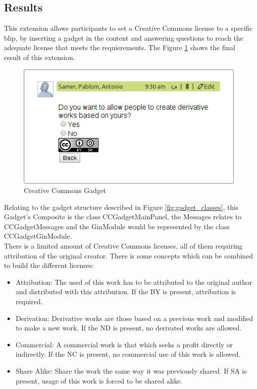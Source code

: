 \subsection{Results}
This extension allows participants to set a Creative Commons license to a specific blip, by inserting a gadget in the content and answering questions to reach the adequate license that meets the requierements. The Figure \ref{fig:cc_gadget} shows the final result of this extension.
\begin{figure}[h]
  \center
    \includegraphics[keepaspectratio, scale=0.7]{Media/Captures/Extensions/CCGadget.png}
  \caption{Creative Commons Gadget}
  \label{fig:cc_gadget}
\end{figure}
Relating to the gadget structure described in Figure \ref{fig:gadget_classes}, this Gadget's Composite is the class CCGadgetMainPanel, the Messages relates to CCGadgetMessages and the GinModule would be represented by the class CCGadgetGinModule.\\[.2cm]
There is a limited amount of Creative Commons licenses, all of them requiring attribution of the original creator. There is some concepts which can be combined to build the different licenses:
\begin{itemize}
  \item Attribution: The used of this work has to be attributed to the original author and distributed with this attribution. If the BY is present, attribution is required.
  \item Derivation: Derivative works are those based on a previous work and modified to make a new work. If the ND is present, no derivated works are allowed.
  \item Commercial: A commercial work is that which seeks a profit directly or indirectly. If the NC is present, no commercial use of this work is allowed.
  \item Share Alike: Share the work the same way it was previously shared. If SA is present, usage of this work is forced to be shared alike.
\end{itemize}
